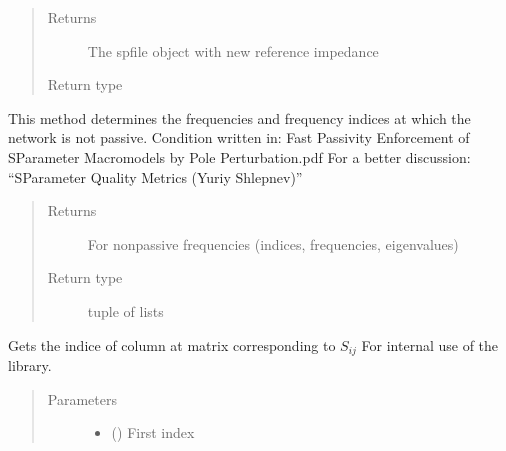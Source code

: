 \documentclass[letterpaper,10pt,english]{sphinxmanual}
\begin{document}
\begin{fulllineitems}
\begin{fulllineitems}
\begin{quote}
\begin{description}
\item[{Returns}] \leavevmode
The spfile object with new reference impedance

\item[{Return type}] \leavevmode
{\hyperref[\detokenize{touchstone:touchstone.spfile}]{}}

\end{description}\end{quote}

\end{fulllineitems}


\begin{fulllineitems}
\label{\detokenize{touchstone:touchstone.spfile.check_passivity}}
This method determines the frequencies and frequency indices at which the network is not passive. Condition written in:
Fast Passivity Enforcement of S\sphinxhyphen{}Parameter Macromodels by Pole Perturbation.pdf
For a better discussion: “S\sphinxhyphen{}Parameter Quality Metrics (Yuriy Shlepnev)”
\begin{quote}\begin{description}
\item[{Returns}] \leavevmode
For non\sphinxhyphen{}passive frequencies (indices, frequencies, eigenvalues)

\item[{Return type}] \sphinxhyphen{}tuple of lists

\end{description}\end{quote}

\end{fulllineitems}


\begin{fulllineitems}
\label{\detokenize{touchstone:touchstone.spfile.column_of_data}}
Gets the indice of column at  matrix corresponding to \(S_{i j}\)
For internal use of the library.
\begin{quote}\begin{description}
\item[{Parameters}] \leavevmode\begin{itemize}
\item {} 
 () \textendash{} First index


\end{itemize}
\end{description}
\end{quote}
\end{fulllineitems}
\end{fulllineitems}
\end{document}
